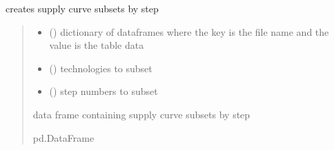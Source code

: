 \documentclass[letterpaper,10pt,english]{sphinxmanual}
\begin{document}
\begin{fulllineitems}
\label{\detokenize{src.models.electricity.scripts.preprocessor:src.models.electricity.scripts.preprocessor.step_sub_sc_subset}}
\pysigstartsignatures
\pysiglinewithargsret
{}
{\sphinxparamcomma {}\sphinxparamcomma {}}
{}
\pysigstopsignatures
\sphinxAtStartPar
creates supply curve subsets by step
\begin{quote}\begin{description}
\begin{itemize}
\item {} 
\sphinxAtStartPar
{} () \textendash{} dictionary of dataframes where the key is the file name and the value is the table data

\item {} 
\sphinxAtStartPar
{} () \textendash{} technologies to subset

\item {} 
\sphinxAtStartPar
{} () \textendash{} step numbers to subset

\end{itemize}

\sphinxAtStartPar
data frame containing supply curve subsets by step

\sphinxAtStartPar
pd.DataFrame

\end{description}\end{quote}

\end{fulllineitems}

\end{document}
